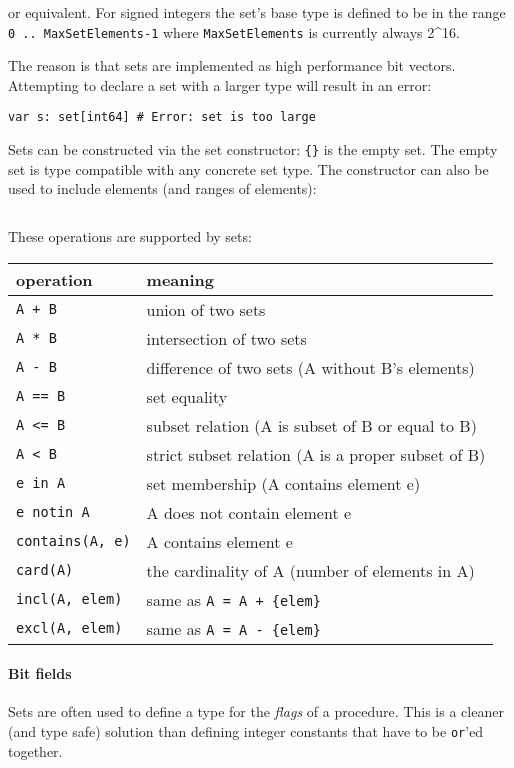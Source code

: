 or equivalent. For signed integers the set's base type is defined to be
in the range \texttt{0\ ..\ MaxSetElements-1} where
\texttt{MaxSetElements} is currently always 2\^{}16.

The reason is that sets are implemented as high performance bit vectors.
Attempting to declare a set with a larger type will result in an error:

\begin{verbatim}
var s: set[int64] # Error: set is too large
\end{verbatim}

Sets can be constructed via the set constructor: \texttt{\{\}} is the
empty set. The empty set is type compatible with any concrete set type.
The constructor can also be used to include elements (and ranges of
elements):

\begin{verbatim}
\end{verbatim}

These operations are supported by sets:

\begin{longtable}[]{@{}ll@{}}
\toprule
operation & meaning\tabularnewline
\midrule
\endhead
\texttt{A\ +\ B} & union of two sets\tabularnewline
\texttt{A\ *\ B} & intersection of two sets\tabularnewline
\texttt{A\ -\ B} & difference of two sets (A without B's
elements)\tabularnewline
\texttt{A\ ==\ B} & set equality\tabularnewline
\texttt{A\ \textless{}=\ B} & subset relation (A is subset of B or equal
to B)\tabularnewline
\texttt{A\ \textless{}\ B} & strict subset relation (A is a proper
subset of B)\tabularnewline
\texttt{e\ in\ A} & set membership (A contains element e)\tabularnewline
\texttt{e\ notin\ A} & A does not contain element e\tabularnewline
\texttt{contains(A,\ e)} & A contains element e\tabularnewline
\texttt{card(A)} & the cardinality of A (number of elements in
A)\tabularnewline
\texttt{incl(A,\ elem)} & same as
\texttt{A\ =\ A\ +\ \{elem\}}\tabularnewline
\texttt{excl(A,\ elem)} & same as
\texttt{A\ =\ A\ -\ \{elem\}}\tabularnewline
\bottomrule
\end{longtable}

\hypertarget{bit-fields}{%
\paragraph{Bit fields}\label{bit-fields}}

Sets are often used to define a type for the \emph{flags} of a
procedure. This is a cleaner (and type safe) solution than defining
integer constants that have to be \texttt{or}'ed together.

